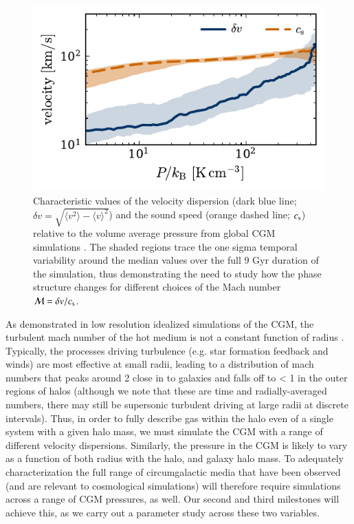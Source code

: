 \documentclass[11pt,letterpaper,english]{article}
\begin{document}
\begin{figure}[h]
    \centering
    \begin{minipage}{0.6\textwidth}
        \includegraphics[width=\textwidth]{../figures/velocity_P.pdf} 
    \end{minipage}\hfill
    \begin{minipage}{0.4\textwidth}
        \centering
\caption{Characteristic values of the velocity dispersion (dark blue line; $\delta v = \sqrt{\langle v^2 \rangle - \langle v \rangle^2}$) and the sound speed (orange dashed line; $c_{\rm s}$) relative to the volume average pressure from global CGM simulations \cite{Fielding17}. The shaded regions trace the one sigma temporal variability around the median values over the full 9 Gyr duration of the simulation, thus demonstrating the need to study how the phase structure changes for different choices of the Mach number $\mathcal{M} = \delta v /  c_{\rm s}$. \label{fig:velocities}} 
\end{minipage}
\end{figure}

As demonstrated in low resolution idealized simulations of the CGM, the turbulent mach number of the hot medium is not a constant function of radius \cite{Fielding17}. Typically, the processes driving turbulence (e.g. star formation feedback and winds) are most effective at small radii, leading to a distribution of mach numbers that peaks around 2 close in to galaxies and falls off to < 1 in the outer regions of halos (although we note that these are time and radially-averaged numbers, there may still be supersonic turbulent driving at large radii at discrete intervals). Thus, in order to fully describe gas within the halo even of a single system with a given halo mass, we must simulate the CGM with a range of different velocity dispersions. Similarly, the pressure in the CGM is likely to vary as a function of both radius with the halo, and galaxy halo mass. To adequately characterization the full range of circumgalactic media that have been observed (and are relevant to cosmological simulations) will therefore require simulations across a range of CGM pressures, as well. Our second and third milestones will achieve this, as we carry out a parameter study across these two variables.
\end{document}
